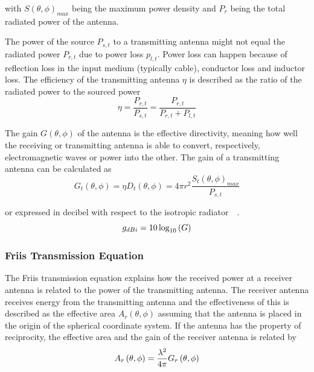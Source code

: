 with $S\left(\theta, \phi\right)_{max}$ being the maximum power density and $P_{r}$ being the total radiated power of the antenna.

The power of the source $P_{s,t}$ to a transmitting antenna might not equal the radiated power $P_{r,t}$ due to power loss $p_{l,t}$. Power loss can happen because of reflection loss in the input medium (typically cable), conductor loss and inductor loss. The efficiency of the transmitting antenna $\eta$ is described as the ratio of the radiated power to the sourced power 
\begin{equation} \label{eq:antenna_efficiency}
    \eta = \frac{P_{r,t}}{P_{s,t}} = \frac{P_{r,t}}{P_{r,t}+P_{l,t}}
\end{equation}

The gain $G \left( \theta, \phi \right)$ of the antenna is the effective directivity, meaning how well the receiving or transmitting antenna is able to convert, respectively, electromagnetic waves or power into the other. The gain of a transmitting antenna can be calculated as
\begin{equation} \label{eq:gain}
    G_t \left( \theta, \phi \right) = \eta  D_t \left(\theta, \phi\right) = 4 \pi r^2 \frac{S_t \left(\theta, \phi\right)_{max}}{P_{s,t}}
\end{equation}

or expressed in decibel with respect to the isotropic radiator~\cite[p. 10]{ant_beam_form}~\cite[pp. 1.8-1.10]{ant_eng_hk}.
\begin{equation} \label{eq:gain_dbi}
    g_{dBi} = 10 \log_{10}\left(G\right)
    \tagaddtext{[\si{\decibel}]}
\end{equation}

\subsubsection{Friis Transmission Equation}
The Friis transmission equation explains how the received power at a receiver antenna is related to the power of the transmitting antenna. The receiver antenna receives energy from the transmitting antenna and the effectiveness of this is described as the effective area $A_r\left( \theta, \phi \right)$ assuming that the antenna is placed in the origin of the spherical coordinate system. If the antenna has the property of reciprocity, the effective area and the gain of the receiver antenna is related by 
\begin{equation} \label{eq:effectivate_area}
    A_r \left( \theta, \phi \right) = \frac{\lambda^2}{4 \pi} G_r \left( \theta, \phi \right)
    \tagaddtext{[\si{\meter\squared}]}
\end{equation}

